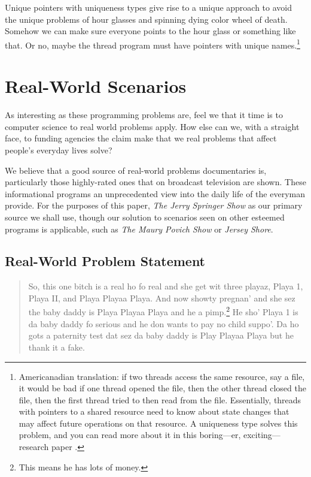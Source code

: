 \documentclass[nocopyrightspace,10pt]{sigplanconf}
\begin{document}
Unique pointers with uniqueness types give rise to a unique approach to avoid the unique problems of hour glasses and spinning dying color wheel of death. Somehow we can make sure everyone points to the hour glass or something like that. Or no, maybe the thread program must have pointers with unique names.\footnote{Americanadian translation: if two threads access the same resource, say a file, it would be bad if one thread opened the file, then the other thread closed the file, then the first thread tried to then read from the file. Essentially, threads with pointers to a shared resource need to know about state changes that may affect future operations on that resource. A uniqueness type solves this problem, and you can read more about it in this boring---er, exciting---research paper \cite{philipp}.}

\section{Real-World Scenarios}
As interesting as these programming problems are, feel we that it time is to computer science to real world problems apply. How else can we, with a straight face, to funding agencies the claim make that we real problems that affect people's everyday lives solve?

We believe that a good source of real-world problems documentaries is, particularly those highly-rated ones that on broadcast television are shown. These informational programs an unprecedented view into the daily life of the everyman provide. For the purposes of this paper, \emph{The Jerry Springer Show} as our primary source we shall use, though our solution to scenarios seen on other esteemed programs is applicable, such as \emph{The Maury Povich Show} or \emph{Jersey Shore}.

\subsection{Real-World Problem Statement}

\begin{quote}
So, this one bitch is a real ho fo real and she get wit three playaz, Playa 1, Playa II, and Playa Playaa Playa. And now showty pregnan' and she sez the baby daddy is Playa Playaa Playa and he a pimp.\footnote{This means he has lots of money.} He sho' Playa 1 is da baby daddy fo serious and he don wants to pay no child suppo'. Da ho gots a paternity test dat sez da baby daddy is Play Playaa Playa but he thank it a fake.
\end{quote}
\end{document}
